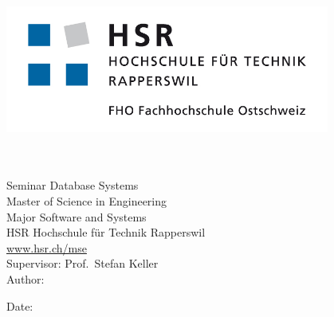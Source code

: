 

\begin{titlepage}


\begin{flushleft}

\noindent\begin{minipage}[t]{0.49\textwidth}
	\begin{flushleft}
		\vspace{0pt} %
		\includegraphics[width=0.8\textwidth]{./images/logo_hsr}
	\end{flushleft}
\end{minipage}
\hfill
\begin{minipage}[t]{0.49\textwidth}
	\begin{flushright}
		\vspace{0pt} %
	\end{flushright}
\end{minipage}
\\[4cm]

{ \huge \bfseries \@title}\\[2cm]

Seminar Database Systems\\[0.5cm]
Master of Science in Engineering\\
Major Software and Systems\\
HSR Hochschule für Technik Rapperswil\\
\url{www.hsr.ch/mse}\\[1cm]

Supervisor: Prof.~Stefan Keller\\[0.3cm]
Author: \@author

\vfill
Date: {\@date}

\end{flushleft}

\end{titlepage}
